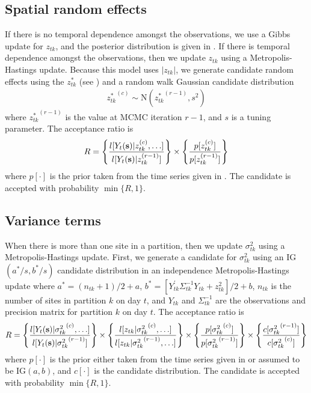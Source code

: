 \subsection*{Spatial random effects}
If there is no temporal dependence amongst the observations, we use a Gibbs update for $z_{tk}$, and the posterior distribution is given in .
If there is temporal dependence amongst the observations, then we update $z_{tk}$ using a Metropolis-Hastings update.
Because this model uses $|z_{tk}|$, we generate candidate random effects using the $z^*_{tk}$ (see ) and a random walk Gaussian candidate distribution
\begin{align*}
  {z^*_{tk}}^{(c)} \sim \text{N}({z^*_{tk}}^{(r - 1)}, s^2)
\end{align*}
where ${z^*_{tk}}^{(r-1)}$ is the value at MCMC iteration $r - 1$, and $s$ is a tuning parameter.
The acceptance ratio is
\begin{align*}
  R = \left\{ \frac{ l[Y_t(\mathbf{s}) | z_{tk}^{(c)}, \ldots] }{ l[Y_t(\mathbf{s}) | z_{tk}^{(r - 1)}]} \right\} \times \left\{ \frac{ p[ z_{tk}^{(c)} ] }{ p[ z_{tk}^{(r - 1)}]}\right\}
\end{align*}
where $p[\cdot]$ is the prior taken from the time series given in .
The candidate is accepted with probability $\min\{R, 1\}$.

\subsection*{Variance terms}
When there is more than one site in a partition, then we update $\sigma^2_{tk}$ using a Metropolis-Hastings update.
First, we generate a candidate for $\sigma^2_{tk}$ using an IG$(a^*/s, b^*/s)$ candidate distribution in an independence Metropolis-Hastings update where $a^* = (n_{tk} + 1) / 2 + a$, $b^* = [Y_{tk}^\prime \Sigma^{-1}_{tk} Y_{tk} + z_{tk}^2] / 2 + b$, $n_{tk}$ is the number of sites in partition $k$ on day $t$, and $Y_{tk}$ and $\Sigma^{-1}_{tk}$ are the observations and precision matrix for partition $k$ on day $t$.
The acceptance ratio is
\begin{align*}
  R = \left\{
    \frac{ l[Y_t(\mathbf{s}) | {\sigma^2_{tk}}^{(c)}, \ldots] }
         { l[Y_t(\mathbf{s}) | {\sigma^2_{tk}}^{(r - 1)}]}
    \right\} \times \left\{
    \frac{ l[z_{tk} | {\sigma^2_{tk}}^{(c)}, \ldots] }
         { l[z_{tk} | {\sigma^2_{tk}}^{(r - 1)}, \ldots] }
    \right\} \times \left\{
    \frac{ p[ {\sigma^2_{tk}}^{(c)} ] }
         { p[ {\sigma^2_{tk}}^{(r - 1)}] }
    \right\} \times \left\{
    \frac{ c[ {\sigma^2_{tk}}^{(r - 1)}] }
         { c[ {\sigma^2_{tk}}^{(c)}]}
    \right\}
\end{align*}
where $p[\cdot]$ is the prior either taken from the time series given in  or assumed to be IG$(a, b)$, and $c[\cdot]$ is the candidate distribution.
The candidate is accepted with probability $\min\{R, 1\}$.

